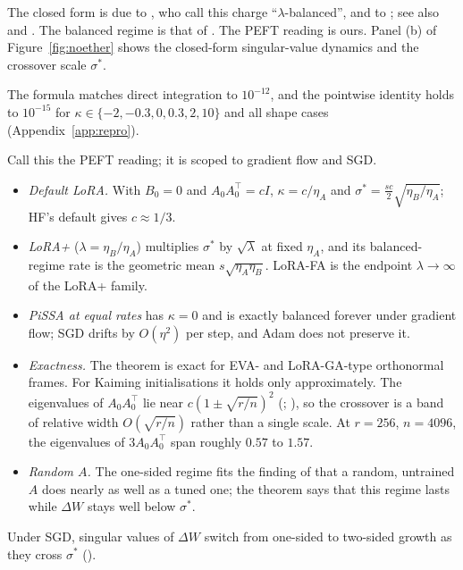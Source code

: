 The closed form is due to \citet{xtarmoun2021understanding}, who call this charge ``$\lambda$-balanced'', and to
\citet{xmin2021explicit}; see also \citet{xdomine2025lazy} and \citet{xkunin2024get}. The balanced regime is that of
\citet{arora2018optimization}. The PEFT reading is ours. Panel (b) of Figure~\ref{fig:noether} shows the closed-form
singular-value dynamics and the crossover scale $\sigma^*$.

\noindent{}\enspace The formula matches direct integration to $10^{-12}$, and the pointwise identity holds to
$10^{-15}$ for $\kappa\in\{-2,-0.3,0,0.3,2,10\}$ and all shape cases (Appendix~\ref{app:repro}).

\begin{explains}
Call this the PEFT reading; it is scoped to gradient flow and SGD.
\begin{itemize}
\item \emph{Default LoRA.} With $B_0=0$ and $A_0A_0^\top=cI$, $\kappa=c/\eta_A$ and
  $\sigma^*=\tfrac{sc}{2}\sqrt{\eta_B/\eta_A}$; HF's default gives $c\approx1/3$.
\item \emph{LoRA+} ($\lambda=\eta_B/\eta_A$) multiplies $\sigma^*$ by $\sqrt\lambda$ at fixed $\eta_A$, and its
  balanced-regime rate is the geometric mean $s\sqrt{\eta_A\eta_B}$. LoRA-FA is the endpoint $\lambda\to\infty$ of the
  LoRA+ family.
\item \emph{PiSSA at equal rates} has $\kappa=0$ and is exactly balanced forever under gradient flow; SGD drifts by
  $O(\eta^2)$ per step, and Adam does not preserve it.
\item \emph{Exactness.} The theorem is exact for EVA- and LoRA-GA-type orthonormal frames. For Kaiming initialisations
  it holds only approximately. The eigenvalues of $A_0A_0^\top$ lie near $c(1\pm\sqrt{r/n})^2$
  (\citealp{xmarchenko1967distribution}; ), so the crossover is a band of relative width $O(\sqrt{r/n})$ rather than a single
  scale. At $r=256$, $n=4096$, the eigenvalues of $3A_0A_0^\top$ span roughly $0.57$ to $1.57$.
\item \emph{Random $A$.} The one-sided regime fits the finding of \citet{zhu2024asymmetry} that a random, untrained $A$
  does nearly as well as a tuned one; the theorem says that this regime lasts while $\Delta W$ stays well below
  $\sigma^*$.
\end{itemize}
\end{explains}

\noindent{}\enspace Under SGD, singular values of $\Delta W$ switch from one-sided to two-sided growth as they cross
$\sigma^*$ ().

